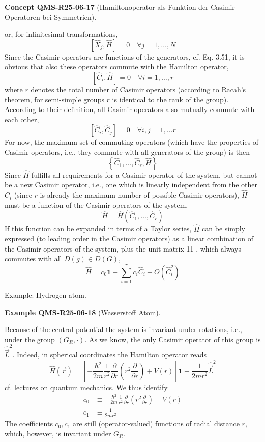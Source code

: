 \documentclass[10pt, letterpaper]{article}
\newcommand{\CustomHeading}[3]{%
  \par\medskip\noindent%
  \textbf{#1 #2} \textnormal{(#3)}.\enskip%
}
\newenvironment{EXA}[2]{\begin{unitbox}\CustomHeading{Example}{#1}{#2}}{\end{unitbox}}
\newenvironment{CONC}[2]{\begin{unitbox}\CustomHeading{Concept}{#1}{#2}}{\end{unitbox}}
\begin{document}
\begin{CONC}{QMS-R25-06-17}{Hamiltonoperator als Funktion der Casimir-Operatoren bei Symmetrien}
$$$$
or, for infinitesimal transformations,
$$
\left[\hat{X}_{j}, \hat{H}\right]=0 \quad \forall j=1, \ldots, N
$$
Since the Casimir operators are functions of the generators, cf. Eq. 3.51, it is obvious that also these operators commute with the Hamilton operator,
$$
\left[\hat{C}_{i}, \hat{H}\right]=0 \quad \forall i=1, \ldots, r
$$
where $r$ denotes the total number of Casimir operators (according to Racah's theorem, for semi-simple groups $r$ is identical to the rank of the group). According to their definition, all Casimir operators also mutually commute with each other,
$$
\left[\hat{C}_{i}, \hat{C}_{j}\right]=0 \quad \forall i, j=1, \ldots r
$$
For now, the maximum set of commuting operators (which have the properties of Casimir operators, i.e., they commute with all generators of the group) is then
$$
\left\{\hat{C}_{1}, \ldots, \hat{C}_{r}, \hat{H}\right\}
$$
Since $\hat{H}$ fulfills all requirements for a Casimir operator of the system, but cannot be a new Casimir operator, i.e., one which is linearly independent from the other $\hat{C}_{i}$ (since $r$ is already the maximum number of possible Casimir operators), $\hat{H}$ must be a function of the Casimir operators of the system,
$$
\hat{H}=\hat{H}\left(\hat{C}_{1}, \ldots, \hat{C}_{r}\right)
$$
If this function can be expanded in terms of a Taylor series, $\hat{H}$ can be simply expressed (to leading order in the Casimir operators) as a linear combination of the Casimir operators of the system, plus the unit matrix 11 , which always commutes with all $D(g) \in D(G)$,
$$
\hat{H}=c_{0} \mathbf{1}+\sum_{i=1}^{r} c_{i} \hat{C}_{i}+O\left(\hat{C}_{i}^{2}\right)
$$
\end{CONC}




Example: Hydrogen atom. 


\begin{EXA}{QMS-R25-06-18}{Wasserstoff Atom}
Because of the central potential the system is invariant under rotations, i.e., under the group $\left(G_{R}, \cdot\right)$. As we know, the only Casimir operator of this group is $\hat{\vec{L}}^{2}$. Indeed, in spherical coordinates the Hamilton operator reads
$$
\hat{H}(\vec{r})=\left[-\frac{\hbar^{2}}{2 m} \frac{1}{r^{2}} \frac{\partial}{\partial r}\left(r^{2} \frac{\partial}{\partial r}\right)+V(r)\right] \mathbf{1}+\frac{1}{2 m r^{2}} \hat{\vec{L}}^{2}
$$
cf. lectures on quantum mechanics. We thus identify
$$
\begin{aligned}
c_{0} & \equiv-\frac{\hbar^{2}}{2 m} \frac{1}{r^{2}} \frac{\partial}{\partial r}\left(r^{2} \frac{\partial}{\partial r}\right)+V(r) \\
c_{1} & \equiv \frac{1}{2 m r^{2}}
\end{aligned}
$$
The coefficients $c_{0}, c_{1}$ are still (operator-valued) functions of radial distance $r$, which, however, is invariant under $G_{R}$.
\end{EXA}
\end{document}
